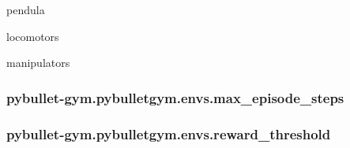 pendula 

locomotors

manipulators 
\subsubsection[{\texorpdfstring{max\+\_\+episode\+\_\+steps}{max_episode_steps}}]{\setlength{\rightskip}{0pt plus 5cm}pybullet-\/gym.\+pybulletgym.\+envs.\+max\+\_\+episode\+\_\+steps}\hypertarget{namespacepybullet-gym_1_1pybulletgym_1_1envs_a80ef9a1469c11fe64e4f9af9050a86fc}{}\label{namespacepybullet-gym_1_1pybulletgym_1_1envs_a80ef9a1469c11fe64e4f9af9050a86fc}
\subsubsection[{\texorpdfstring{reward\+\_\+threshold}{reward_threshold}}]{\setlength{\rightskip}{0pt plus 5cm}pybullet-\/gym.\+pybulletgym.\+envs.\+reward\+\_\+threshold}\hypertarget{namespacepybullet-gym_1_1pybulletgym_1_1envs_a8ccc77f51a77e077c3acb6c6cdceeda3}{}\label{namespacepybullet-gym_1_1pybulletgym_1_1envs_a8ccc77f51a77e077c3acb6c6cdceeda3}
